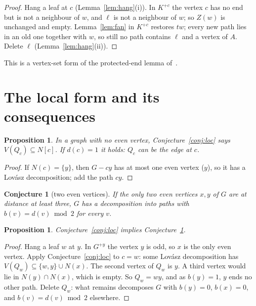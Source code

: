 \documentclass[11pt]{amsart}
\newtheorem{proposition}[theorem]{Proposition}
\newtheorem{conjecture}[theorem]{Conjecture}
\theoremstyle{definition}
\begin{document}
\begin{proof}
Hang a leaf at $c$ (Lemma~\ref{lem:hang}(i)). In $K^{+c}$ the vertex $c$ has no end but is not a
neighbour of $w$, and $\ell$ is not a neighbour of $w$; so $Z(w)$ is unchanged and empty.
Lemma~\ref{lem:fan} in $K^{+c}$ restores $tw$; every new path lies in an old one together with $w$, so
still no path contains $\ell$ and a vertex of $A$. Delete $\ell$ (Lemma~\ref{lem:hang}(ii)).
\end{proof}

This is a vertex-set form of the protected-end lemma of~\cite[Lemma~4.1]{PE}.

\section{The local form and its consequences}\label{sec:local}

\begin{proposition}\label{prop:allodd}
In a graph with no even vertex, Conjecture~\ref{conj:loc} says $V(Q_c)\subseteq N[c]$. If $d(c)=1$
it holds: $Q_c$ can be the edge at $c$.
\end{proposition}

\begin{proof}
If $N(c)=\{y\}$, then $G-cy$ has at most one even vertex ($y$), so it has a Lov\'asz decomposition;
add the path $cy$.
\end{proof}

\begin{conjecture}[two even vertices]\label{conj:te3}
If the only two even vertices $x,y$ of $G$ are at distance at least three, $G$ has a decomposition
into paths with $b(v)=d(v)\bmod2$ for every $v$.
\end{conjecture}

\begin{proposition}\label{prop:te3}
Conjecture~\ref{conj:loc} implies Conjecture~\ref{conj:te3}.
\end{proposition}

\begin{proof}
Hang a leaf $w$ at $y$. In $G^{+y}$ the vertex $y$ is odd, so $x$ is the only even vertex. Apply
Conjecture~\ref{conj:loc} to $c=w$: some Lov\'asz decomposition has
$V(Q_w)\subseteq\{w,y\}\cup N(x)$. The second vertex of $Q_w$ is $y$. A third vertex would lie
in $N(y)\cap N(x)$, which is empty. So $Q_w=wy$, and as $b(y)=1$, $y$ ends no other path.
Delete $Q_w$: what remains decomposes $G$ with $b(y)=0$, $b(x)=0$, and $b(v)=d(v)\bmod2$ elsewhere.
\end{proof}
\end{document}
